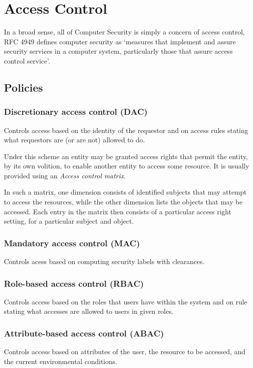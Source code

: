 \section{Access Control}
In a broad sense, all of Computer Security is simply a concern of access control,
RFC 4949 defines computer security as `measures that implement and assure security
services in a computer system, particularly those that assure access control service'.

\subsection{Policies}
\subsubsection{Discretionary access control (DAC)}
Controls access based on the identity of the requestor and on access rules
stating what requestors are (or are not) allowed to do.

Under this scheme an entity may be granted access rights that permit the entity, by its own volition,
to enable another entity to access some resource. It is usually provided using an \textit{Access control matrix}.

In such a matrix, one dimension consists of identified subjects that may attempt to access
the resources, while the other dimension lists the objects that may be accessed. Each entry in the matrix then consists of
a particular access right setting, for a particular subject and object.

\subsubsection{Mandatory access control (MAC)}
Controls acess based on computing security labels with clearances.

\subsubsection{Role-based access control (RBAC)}
Controls access based on the roles that users have within the system and on rule stating 
what accesses are allowed to users in given roles.

\subsubsection{Attribute-based access control (ABAC)}
Controls access based on attributes of the user, the resource to be accessed, and the 
current environmental conditions.

